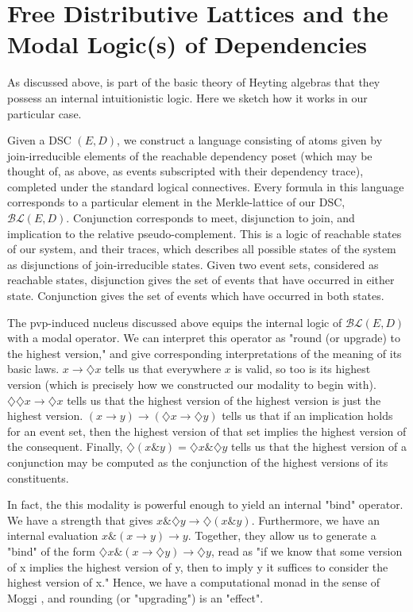 \documentclass[hoptionsi,review,format=acmsmall]{acmart}
\theoremstyle{definition}
\newcommand{\BLc}{\mathcal{BL}}
\newcommand{\band}{\mathbin{\&}}
\newcommand{\Dia}{\diamondsuit}
\begin{document}
\section{Free Distributive Lattices and the Modal Logic(s) of Dependencies}
As discussed above, is part of the basic theory of Heyting algebras that they possess an internal intuitionistic logic. Here we sketch how it works in our particular case.

Given a DSC \((E,D)\), we construct a language consisting of atoms given by join-irreducible elements of the reachable dependency poset (which may be thought of, as above, as events subscripted with their dependency trace), completed under the standard logical connectives. Every formula in this language corresponds to a particular element in the Merkle-lattice of our DSC, \(\BLc(E,D)\).  Conjunction corresponds to meet, disjunction to join, and implication to the relative pseudo-complement. This is a logic of reachable states of our system, and their traces, which describes all possible states of the system as disjunctions of join-irreducible states. Given two event sets, considered as reachable states, disjunction gives the set of events that have occurred in either state. Conjunction gives the set of events which have occurred in both states.


The pvp-induced nucleus discussed above equips the internal logic of \(\BLc(E,D)\) with a modal operator. We can interpret this operator as "round (or upgrade) to the highest version," and give corresponding interpretations of the meaning of its basic laws. \(x \rightarrow \Dia{x}\) tells us that everywhere \(x\) is valid, so too is its highest version (which is precisely how we constructed our modality to begin with). \(\Dia\Dia{x} \rightarrow \Dia{x}\) tells us that the highest version of the highest version is just the highest version. \((x \rightarrow y) \rightarrow (\Dia{x} \rightarrow \Dia{y})\)  tells us that if an implication holds for an event set, then the highest version of that set implies the highest version of the consequent. Finally, \(\Dia(x \band y) = \Dia{x} \band \Dia{y}\) tells us that the highest version of a conjunction may be computed as the conjunction of the highest versions of its constituents.

In fact, the this modality is powerful enough to yield an internal "bind" operator. We have a strength that gives \(x \band \Dia{y} \rightarrow \Dia(x \band y)\). Furthermore, we have an internal evaluation \(x \band (x \rightarrow y) \rightarrow y\). Together, they allow us to generate a "bind" of the form \(\Dia{x} \band (x \rightarrow \Dia{y}) \rightarrow \Dia{y}\), read as "if we know that some version of x implies the highest version of y, then to imply y it suffices to consider the highest version of x." Hence, we have a computational monad in the sense of Moggi \cite{moggi1991notions}, and rounding (or "upgrading") is an "effect".
\end{document}
